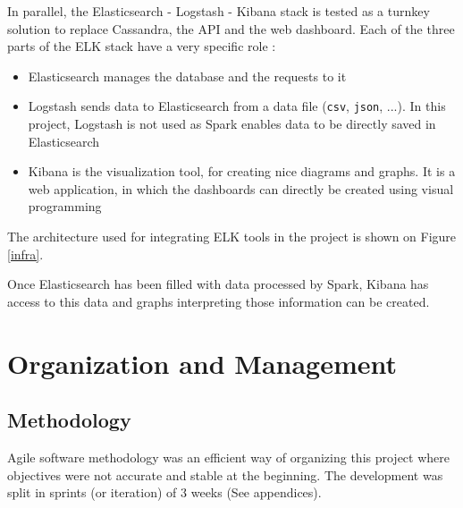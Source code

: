 \documentclass[11pt]{article}
\begin{document}
In parallel, the \textsf{Elasticsearch} - \textsf{Logstash} - \textsf{Kibana} stack is tested as a turnkey solution to replace \textsf{Cassandra}, the API and the web dashboard.
Each of the three parts of the \textsf{ELK} stack have a very specific role : 
\begin{itemize}
\item \textsf{Elasticsearch} manages the database and the requests to it
\item \textsf{Logstash} sends data to \textsf{Elasticsearch} from a data file (\texttt{csv}, \texttt{json}, ...). In this project, \textsf{Logstash} is not used as \textsf{Spark} enables data to be directly saved in \textsf{Elasticsearch}
\item \textsf{Kibana} is the visualization tool, for creating nice diagrams and graphs. It is a web application, in which the dashboards can directly be created using visual programming
\end{itemize}

The architecture used for integrating \textsf{ELK} tools in the project is shown on Figure \ref*{infra}.


Once \textsf{Elasticsearch} has been filled with data processed by \textsf{Spark}, \textsf{Kibana} has access to this data and graphs interpreting those information can be created.

%
%

\section{Organization and Management}

\subsection{Methodology}

Agile software methodology was an efficient way of organizing this project where objectives were not accurate and stable at the beginning. The development was split in sprints (or iteration) of 3 weeks (See appendices).
\end{document}
